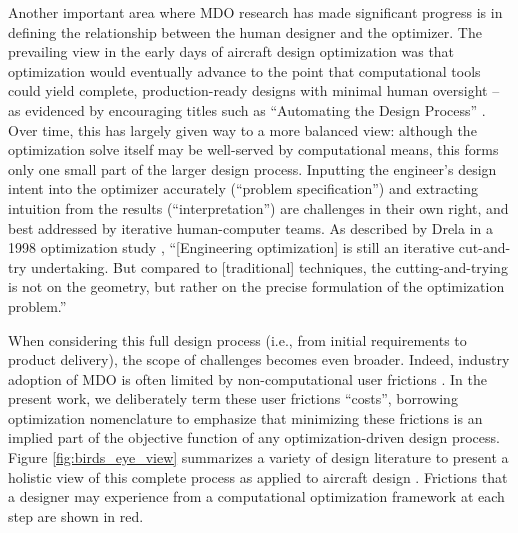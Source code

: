 Another important area where MDO research has made significant progress is in defining the relationship between the human designer and the optimizer. The prevailing view in the early days of aircraft design optimization was that optimization would eventually advance to the point that computational tools could yield complete, production-ready designs with minimal human oversight -- as evidenced by encouraging titles such as ``Automating the Design Process'' \cite{heldenfels_automating_1973, heldenfels_automation_1974, vanderplaats_automated_1976}. Over time, this has largely given way to a more balanced view: although the optimization solve itself may be well-served by computational means, this forms only one small part of the larger design process. Inputting the engineer's design intent into the optimizer accurately (``problem specification'') and extracting intuition from the results (``interpretation'') are challenges in their own right, and best addressed by iterative human-computer teams. As described by Drela in a 1998 optimization study \cite{drela_pros_1998}, ``[Engineering optimization] is still an iterative cut-and-try undertaking. But compared to [traditional] techniques, the cutting-and-trying is not on the geometry, but rather on the precise formulation of the optimization problem.''

When considering this full design process (i.e., from initial requirements to product delivery), the scope of challenges becomes even broader. Indeed, industry adoption of MDO is often limited by non-computational user frictions \cite{salas_framework_1998, gpkit, martins_engineering_2021}. In the present work, we deliberately term these user frictions ``costs'', borrowing optimization nomenclature to emphasize that minimizing these frictions is an implied part of the objective function of any optimization-driven design process. Figure \ref{fig:birds_eye_view} summarizes a variety of design literature to present a holistic view of this complete process as applied to aircraft design \cite{torenbeek_advanced_2013, martins_engineering_2021, yang_observations_2009, torenbeek_synthesis_1976, roskam_airplane_1989, nicolai_fundamentals_2010, salas_framework_1998}. Frictions that a designer may experience from a computational optimization framework at each step are shown in \textcolor[HTML]{BB5045}{red}.

